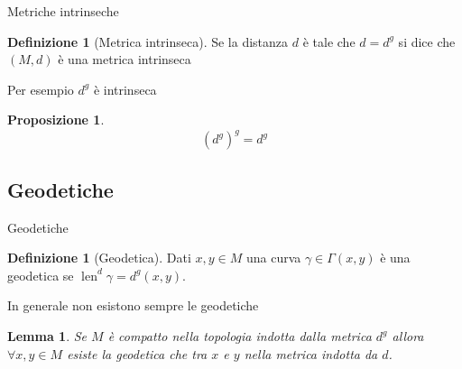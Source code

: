 \documentclass{beamer}
\newcounter{counter1}
\theoremstyle{plain}
\newtheorem{mylem}[counter1]{Lemma}
\newtheorem{mypro}[counter1]{Proposizione}
\theoremstyle{definition}
\newtheorem{mydef}[counter1]{Definizione}
\theoremstyle{remark}
\newcommand{\pa}[1]{\left(#1\right)}
\newcommand{\bra}[1]{\left[#1\right]}
\DeclareMathOperator{\len}{len}
\begin{document}
\begin{frame}{Metriche intrinseche}
  \begin{mydef}[Metrica intrinseca]
    Se la distanza $d$ è tale che $d = d^g$ si dice che $(M,d)$ è una
    metrica intrinseca
  \end{mydef}

  Per esempio $d^g$ è intrinseca
  \begin{mypro}
    \[\pa{d^g}^g = d^g\]
  \end{mypro}
\end{frame}

\subsection{Geodetiche}


\begin{frame}{Geodetiche}
  \begin{mydef}[Geodetica]
    Dati $x,y \in M$ una curva $\gamma \in \Gamma\pa{x,y}$ è una
    geodetica se $\len ^d \gamma = d^g(x,y)$.
  \end{mydef}

  In generale non esistono sempre le geodetiche
  \begin{mylem}
    Se $M$ \`e compatto nella topologia indotta dalla metrica $d^g$
    allora $\forall x,y \in M$ esiste la geodetica che tra $x$ e $y$
    nella metrica indotta da $d$.
  \end{mylem}
\end{frame}
\end{document}
